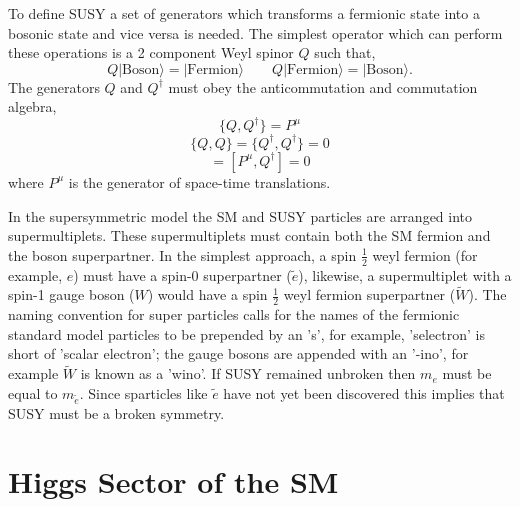 To define SUSY a set of generators which 
transforms a fermionic state into a bosonic state and vice versa is needed. The simplest 
operator which can perform these operations is a 2 component Weyl spinor $Q$
such that,
\begin{equation}
Q|\mathrm{Boson}\rangle=|\mathrm{Fermion}\rangle \qquad Q|\mathrm{Fermion}\rangle=|\mathrm{Boson}\rangle.
\end{equation}
The generators $Q$ and $Q^{\dagger}$ must obey the anticommutation
and commutation algebra,
\begin{equation}
\{Q,Q^{\dagger}\}=P^{\mu}
\end{equation}
\begin{equation}
\{Q,Q\}=\{Q^{\dagger},Q^{\dagger}\}=0
\end{equation}
\begin{equation}
[P^{\mu},Q ]=[P^{\mu},Q^{\dagger}]=0
\end{equation}
where $P^{\mu}$ is the generator of space-time translations.

In the supersymmetric model the SM and SUSY particles are arranged
into supermultiplets. These supermultiplets must contain both the SM fermion
and the boson superpartner. In the simplest approach, a  spin $\frac{1}{2}$
weyl fermion (for example, $e$) must have %
a spin-0 superpartner ($\tilde{e}$), likewise, a supermultiplet 
with a spin-1 gauge boson ($W$) would have
 a spin $\frac{1}{2}$ weyl fermion superpartner ($\tilde{W}$).
The naming convention for super particles calls for the names of
the fermionic standard model particles to be prepended by an 's', for example, 
'selectron' is short of 'scalar electron'; the gauge bosons are appended
with an '-ino', for example $\tilde{W}$ is known as a 'wino'. If SUSY remained unbroken
then $m_{e}$ must be equal to $m_{\tilde{e}}$. Since sparticles like $\tilde{e}$ have not 
yet been discovered this implies that SUSY must be a broken
symmetry.

\section{Higgs Sector of the SM}

